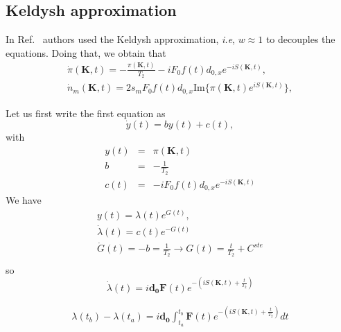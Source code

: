 \documentclass[a4paper,11pt]{report}
\renewcommand{\vec}[1]{\mathbf{#1}}
\begin{document}
\subsection{Keldysh approximation}

In Ref.~\cite{PhysRevLett.113.073901} authors used the Keldysh approximation, \textit{i.e}, $w\approx 1$ to decouples the equations.
Doing that, we obtain that
\begin{subequations}
 \begin{align}
 \dot{\pi}(\vec{K},t) = -\frac{\pi(\vec{K},t)}{T_2} - i F_0f(t)d_{0,x}e^{-iS(\vec{K},t)}, \\
 \dot{n}_m(\vec{K},t) = 2s_m F_0f(t)d_{0,x}\mathrm{Im}\{\pi(\vec{K},t)e^{iS(\vec{K},t)}\},
 \end{align}
\end{subequations}

Let us first write the first equation as
\begin{equation}
 \dot{y}(t) = by(t) + c(t),
\end{equation}
with
\begin{eqnarray}
 y(t) &=& \pi(\vec{K},t)\nonumber\\
 b &=& -\frac{1}{T_2} \nonumber\\
 c(t) &=& - i F_0f(t)d_{0,x}e^{-iS(\vec{K},t)}\nonumber
\end{eqnarray}
We have
\begin{eqnarray}
 y(t) = \lambda(t)e^{G(t)},\\
 \dot{\lambda}(t) = c(t)e^{-G(t)}\\
 \dot{G}(t) = -b = \frac{1}{T_2} \rightarrow G(t) = \frac{t}{T_2}+C^{ste}\\
\end{eqnarray}
so
\begin{equation}
  \dot{\lambda}(t)  =  i\vec{d_{0}}\vec{F}(t)e^{-(iS(\vec{K},t)+\frac{t}{T_2})}
\end{equation}

\begin{eqnarray}
  \lambda(t_b)-\lambda(t_a) = i\vec{d_{0}}\int_{t_a}^{t_b}\vec{F}(t)e^{-(iS(\vec{K},t)+\frac{t}{T_2})}dt%
\end{eqnarray}
\end{document}

